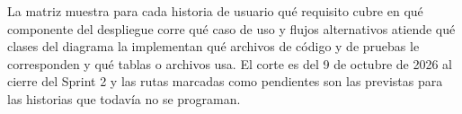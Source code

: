 
\clearpage
{}\label{anexo:B}

La matriz muestra para cada historia de usuario qué requisito cubre en qué componente del despliegue corre qué caso de uso y flujos alternativos atiende qué clases del diagrama la implementan qué archivos de código y de pruebas le corresponden y qué tablas o archivos usa. El corte es del 9 de octubre de 2026 al cierre del Sprint 2 y las rutas marcadas como pendientes son las previstas para las historias que todavía no se programan.



